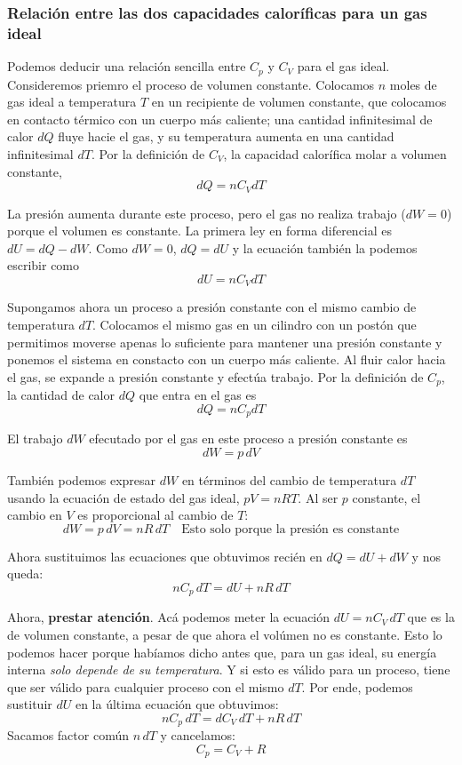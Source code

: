 \documentclass[12pt]{article}
\begin{document}
  \subsubsection{Relación entre las dos capacidades caloríficas para un gas ideal}
  Podemos deducir una relación sencilla entre $ C_{p} $ y $ C_{V} $ para el gas ideal. Consideremos priemro el proceso de volumen constante. Colocamos $ n $ moles de gas ideal a temperatura $ T $ en un recipiente de volumen constante, que colocamos en contacto térmico con un cuerpo más caliente; una cantidad infinitesimal de calor $ dQ $ fluye hacie el gas, y su temperatura aumenta en una cantidad infinitesimal $ dT $. Por la definición de $ C_{V} $, la capacidad calorífica molar a volumen constante,
  \[
  dQ = nC_{V}dT
  \]

  La presión aumenta durante este proceso, pero el gas no realiza trabajo ($ dW = 0 $) porque el volumen es constante. La primera ley en forma diferencial es $ dU = dQ - dW $. Como $ dW = 0 $, $ dQ = dU $ y la ecuación también la podemos escribir como 
  \[
  dU = nC_{V}dT
  \]

  Supongamos ahora un proceso a presión constante con el mismo cambio de temperatura $ dT $. Colocamos el mismo gas en un cilindro con un postón que permitimos moverse apenas lo suficiente para mantener una presión constante y ponemos el sistema en constacto con un cuerpo más caliente. Al fluir calor hacia el gas, se expande a presión constante y efectúa trabajo. Por la definición de $ C_{p} $, la cantidad de calor $ dQ $ que entra en el gas es 
  \[
    dQ = nC_{p}dT
  \]

  El trabajo $ dW $ efecutado por el gas en este proceso a presión constante es 
  \[
    dW = p\,dV
  \]

  También podemos expresar $ dW $ en términos del cambio de temperatura $ dT $ usando la ecuación de estado del gas ideal, $ pV = nRT $. Al ser $ p $ constante, el cambio en $ V $ es proporcional al cambio de $ T $:
  \[
  dW = p\,dV = nR\,dT \quad \text{Esto solo porque la presión es constante}
  \]

  Ahora sustituimos las ecuaciones que obtuvimos recién en $ dQ = dU + dW $ y nos queda:
  \[
  nC_{p}\,dT = dU + nR\,dT
  \]

  Ahora, \textbf{prestar atención}. Acá podemos meter la ecuación $ dU = nC_{V}\,dT $ que es la de volumen constante, a pesar de que ahora el volúmen no es constante. Esto lo podemos hacer porque habíamos dicho antes que, para un gas ideal, su energía interna \textit{solo depende de su temperatura}. Y si esto es válido para un proceso, tiene que ser válido para cualquier proceso con el mismo $ dT $. Por ende, podemos sustituir $ dU $ en la última ecuación que obtuvimos:
  \[
    nC_{p}\,dT = dC_{V}\,dT + nR\,dT
  \]
  Sacamos factor común $ n\,dT $ y cancelamos:
  \[
    C_{p} = C_{V} + R
  \]
\end{document}
